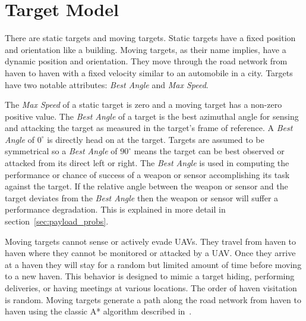 \section{Target Model}

There are static targets and moving targets.  Static targets have a fixed position and orientation like a building.  Moving targets, as their name implies, have a dynamic position and orientation.  They move through the road network from haven to haven with a fixed velocity similar to an automobile in a city.  Targets have two notable attributes: \textit{Best Angle} and \textit{Max Speed}.

The \textit{Max Speed} of a static target is zero and a moving target has a non-zero positive value.  The \textit{Best Angle} of a target is the best azimuthal angle for sensing and attacking the target as measured in the target's frame of reference.  A \textit{Best Angle} of $0^{\circ}$ is directly head on at the target.  Targets are assumed to be symmetrical so a \textit{Best Angle} of $90^{\circ}$ means the target can be best observed or attacked from its direct left or right.  The \textit{Best Angle} is used in computing the performance or chance of success of a weapon or sensor accomplishing its task against the target.  If the relative angle between the weapon or sensor and the target deviates from the \textit{Best Angle} then the weapon or sensor will suffer a performance degradation.  This is explained in more detail in section~\ref{sec:payload_probs}.

Moving targets cannot sense or actively evade UAVs.  They travel from haven to haven where they cannot be monitored or attacked by a UAV.  Once they arrive at a haven they will stay for a random but limited amount of time before moving to a new haven.  This behavior is designed to mimic a target hiding, performing deliveries, or having meetings at various locations.  The order of haven visitation is random.  Moving targets generate a path along the road network from haven to haven using the classic A* algorithm described in~\cite{wiki:astar}.

